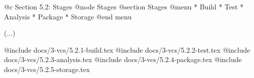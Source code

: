 @c Section 5.2: Stages
@node Stages
@section Stages
@menu
* Build
* Test
* Analysis
* Package
* Storage
@end menu

(...)

@include docs/3-vcs/5.2.1-build.tex
@include docs/3-vcs/5.2.2-test.tex
@include docs/3-vcs/5.2.3-analysis.tex
@include docs/3-vcs/5.2.4-package.tex
@include docs/3-vcs/5.2.5-storage.tex
